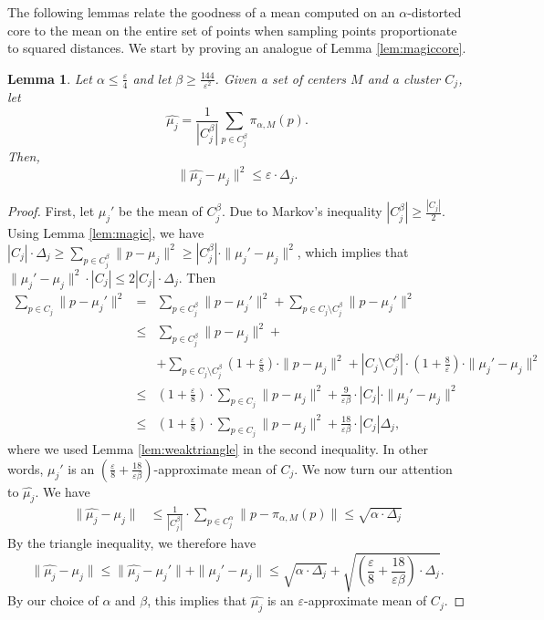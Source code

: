 \documentclass[10pt,a4paper]{amsart}
\newtheorem{lemma}[theorem]{Lemma}
\begin{document}
The following lemmas relate the goodness of a mean computed on an $\alpha$-distorted core to the mean on the entire set of points when sampling points proportionate to squared distances. We start by proving an analogue of Lemma \ref{lem:magiccore}.
\begin{lemma}
\label{lem:core}
Let $\alpha \leq\frac{\varepsilon}{4}$ and let $\beta\geq \frac{144}{\varepsilon^{2}}$.
Given a set of centers $M$ and a cluster $C_j$, let 
$$\hat{\mu_j} = \frac{1}{|C_j^\beta|}\sum_{p\in C_j^\beta} \pi_{\alpha,M}(p).$$ 
Then,
$$\|\hat{\mu_j}-\mu_j\|^2\leq \varepsilon\cdot \Delta_j.$$
\end{lemma}
\begin{proof}
First, let $\mu_j'$ be the mean of $C_j^\beta$. Due to Markov's inequality $|C_j^\beta|\geq \frac{|C_j|}{2}$. Using Lemma \ref{lem:magic}, we have $|C_j|\cdot \Delta_j \geq \sum_{p\in C_j^\beta}\|p-\mu_j\|^2 \geq |C_j^\beta|\cdot\|\mu_j'-\mu_j\|^2$, which implies that $\|\mu_j'-\mu_j\|^2 \cdot |C_j|\leq 2|C_j| \cdot \Delta_j$. Then
\begin{eqnarray*}
 \sum_{p\in C_j} \|p-\mu_j'\|^2 
& = & \sum_{p\in C_j^\beta}\|p-\mu_j'\|^2 + \sum_{p\in C_j\setminus C_j^\beta}\|p-\mu_j'\|^2\\
&\leq& \sum_{p\in C_j^\beta}\|p-\mu_j\|^2 + \\
& & + \sum_{p\in C_j\setminus C_j^\beta}\left(1+\frac{\varepsilon}{8}\right)\cdot \|p-\mu_j\|^2 + |C_j\setminus C_j^\beta|\cdot \left(1+\frac{8}{\varepsilon}\right)\cdot \|\mu_j'-\mu_j\|^2 \\
&\leq& \left(1+\frac{\varepsilon}{8}\right)\cdot \sum_{p\in C_j}\|p-\mu_j\|^2  + \frac{9}{\varepsilon\beta} \cdot |C_j| \cdot \|\mu_j'-\mu_j\|^2 \\
&\leq& \left(1+\frac{\varepsilon}{8}\right)\cdot \sum_{p\in C_j}\|p-\mu_j\|^2  + \frac{18}{\varepsilon\beta} \cdot |C_j|\Delta_j,
\end{eqnarray*}
where we used Lemma \ref{lem:weaktriangle} in the second inequality.
In other words, $\mu_j'$ is an $\left(\frac{\varepsilon}{8} + \frac{18}{\varepsilon\beta}\right)$-approximate mean of $C_j$. We now turn our attention to $\hat{\mu_j}$. We have
\begin{align*}
\|\hat{\mu_j}-\mu_j\| & \leq \frac{1}{|C_j^\beta|}\cdot \sum_{p\in C_j^\alpha}\|p-\pi_{\alpha,M}(p)\| \leq \sqrt{\alpha\cdot \Delta_j}
\end{align*}
By the triangle inequality, we therefore have
$$\|\hat{\mu_j}-\mu_j\|\leq \|\hat{\mu_j} - \mu_j'\|+\|\mu_j'-\mu_j\| \leq \sqrt{\alpha\cdot \Delta_j} + \sqrt{\left(\frac{\varepsilon}{8} + \frac{18}{\varepsilon\beta}\right)\cdot \Delta_j}.$$
By our choice of $\alpha$ and $\beta$, this implies that $\hat{\mu_j}$ is an $\varepsilon$-approximate mean of $C_j$. 
\end{proof}
\end{document}
